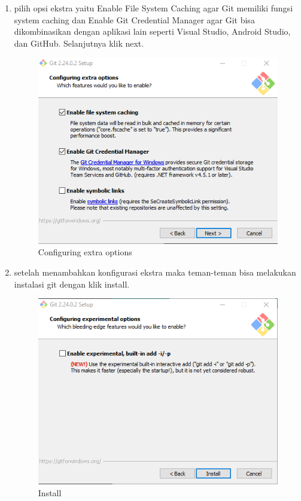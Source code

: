 \begin{enumerate}
\item pilih opsi ekstra yaitu Enable File System Caching agar Git memiliki fungsi system caching dan Enable Git Credential Manager agar Git bisa dikombinasikan dengan aplikasi lain seperti Visual Studio, Android Studio, dan GitHub. Selanjutnya klik next.
\begin{figure}[H]
\centering
\includegraphics[scale=.5]{figures/install_git10}
\caption{Configuring extra options}
\label{install_git10}
\end{figure}

\item setelah menambahkan konfigurasi ekstra maka teman-teman bisa melakukan instalasi git dengan klik install.
\begin{figure}[H]
\centering
\includegraphics[scale=.5]{figures/install_git11}
\caption{Install}
\label{install_git11}
\end{figure}


\end{enumerate}
